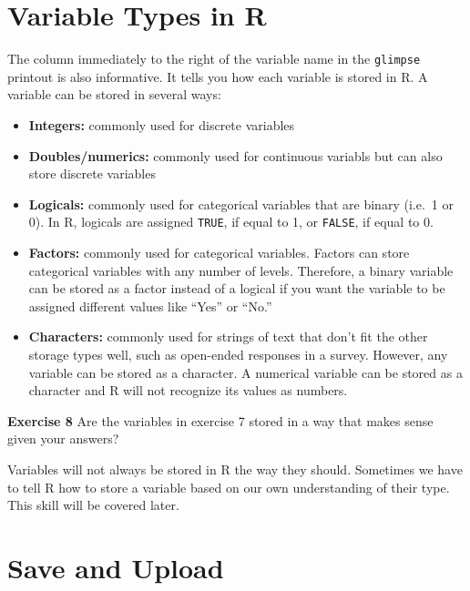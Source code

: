 \documentclass[
]{book}
\providecommand{\tightlist}{%
  \setlength{\itemsep}{0pt}\setlength{\parskip}{0pt}}
\newenvironment{rmdblock}[1]
  {\begin{shaded*}
  }
  {\end{shaded*}
  }
\newenvironment{learncheck}
  {\begin{rmdblock}{warning}}
  {\end{rmdblock}}
\begin{document}
\hypertarget{variable-types-in-r}{%
\section{Variable Types in R}\label{variable-types-in-r}}

The column immediately to the right of the variable name in the \texttt{glimpse} printout is also informative. It tells you how each variable is stored in R. A variable can be stored in several ways:

\begin{itemize}
\tightlist
\item
  \textbf{Integers:} commonly used for discrete variables
\item
  \textbf{Doubles/numerics:} commonly used for continuous variabls but can also store discrete variables
\item
  \textbf{Logicals:} commonly used for categorical variables that are binary (i.e.~1 or 0). In R, logicals are assigned \texttt{TRUE}, if equal to 1, or \texttt{FALSE}, if equal to 0.
\item
  \textbf{Factors:} commonly used for categorical variables. Factors can store categorical variables with any number of levels. Therefore, a binary variable can be stored as a factor instead of a logical if you want the variable to be assigned different values like ``Yes'' or ``No.''
\item
  \textbf{Characters:} commonly used for strings of text that don't fit the other storage types well, such as open-ended responses in a survey. However, any variable can be stored as a character. A numerical variable can be stored as a character and R will not recognize its values as numbers.
\end{itemize}

\begin{learncheck}
\textbf{Exercise 8} Are the variables in exercise 7 stored in a way that
makes sense given your answers?
\end{learncheck}

Variables will not always be stored in R the way they should. Sometimes we have to tell R how to store a variable based on our own understanding of their type. This skill will be covered later.

\hypertarget{save-and-upload}{%
\section{Save and Upload}\label{save-and-upload}}
\end{document}
